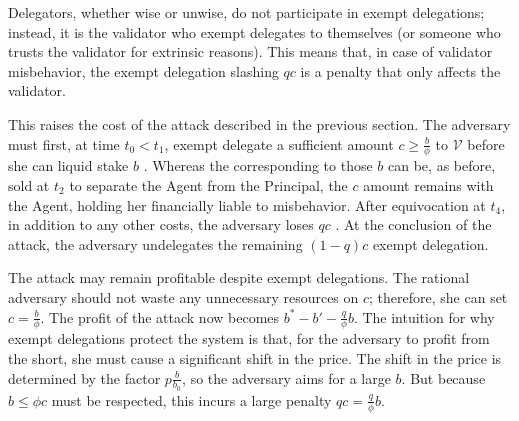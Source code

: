 Delegators, whether wise or unwise, do not participate in exempt
delegations; instead, it is the validator who exempt delegates to
themselves (or someone who trusts the validator for extrinsic reasons).
This means that, in case of validator misbehavior, the exempt delegation
slashing $qc$ is a penalty that only affects the validator.

This raises
the cost of the attack described in the previous section. The
adversary must first, at time $t_0 < t_1$, exempt delegate a sufficient amount
$c \geq \frac{b}{\phi}$ \asset to $\mathcal{V}$ before she can liquid stake $b$ \asset.
Whereas the \stassets
corresponding to those $b$ \assets can be, as before, sold at $t_2$ to
separate the Agent from the Principal, the $c$ amount remains with the
Agent, holding her financially liable to misbehavior. After equivocation at $t_4$,
in addition to any other costs, the adversary loses $qc$ \asset. At the conclusion
of the attack, the adversary undelegates the remaining $(1 - q)c$ exempt delegation.

The attack may remain profitable despite exempt delegations.
The rational adversary should not waste any unnecessary resources on
$c$; therefore, she can set $c = \frac{b}{\phi}$. The profit of the attack now
becomes $b^* - b' - \frac{q}{\phi}b$.
The intuition for why exempt delegations protect the system is that,
for the adversary to profit from the short, she must cause a significant
shift in the price. The shift in the price is determined by the factor
$p\frac{b}{b_0}$, so the adversary aims for a large $b$. But because $b \leq \phi c$
must be respected, this incurs a large penalty $qc = \frac{q}{\phi}b$.

